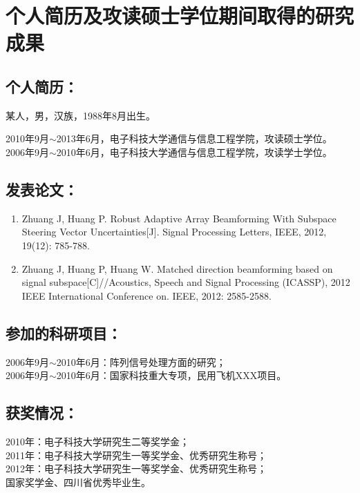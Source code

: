 
\chapter*{个人简历及攻读硕士学位期间取得的研究成果}
{}
\section*{个人简历：}

\noindent 某人，男，汉族，1988年8月出生。

\noindent 2010年9月$\sim$2013年6月，电子科技大学通信与信息工程学院，攻读硕士学位。\\
2006年9月$\sim$2010年6月，电子科技大学通信与信息工程学院，攻读学士学位。

\section*{发表论文：}
\renewcommand{\labelenumi}{[\theenumi]}
\begin{enumerate}[labelindent=0pt]
\item Zhuang J, Huang P. Robust Adaptive Array Beamforming With Subspace Steering Vector Uncertainties[J]. Signal Processing Letters, IEEE, 2012, 19(12): 785-788.
\item Zhuang J, Huang P, Huang W. Matched direction beamforming based on signal subspace[C]//Acoustics, Speech and Signal Processing (ICASSP), 2012 IEEE International Conference on. IEEE, 2012: 2585-2588.
\end{enumerate}

\section*{参加的科研项目：}

\noindent 2006年9月$\sim$2010年6月：阵列信号处理方面的研究；\\
2006年9月$\sim$2010年6月：国家科技重大专项，民用飞机XXX项目。

\section*{获奖情况：}

\noindent 2010年：电子科技大学研究生二等奖学金；\\
2011年：电子科技大学研究生一等奖学金、优秀研究生称号；\\
2012年：电子科技大学研究生一等奖学金、优秀研究生称号；\\
\hspace*{4em}国家奖学金、四川省优秀毕业生。\\